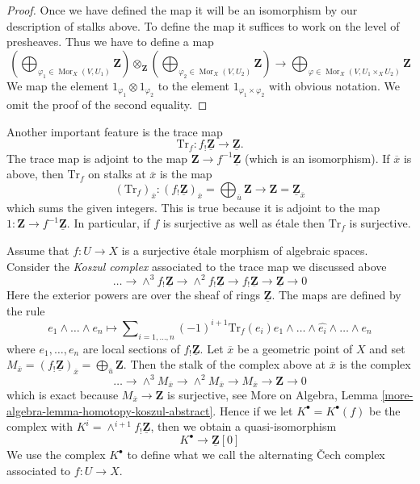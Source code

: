 \documentclass{stacks-project}
\theoremstyle{plain}
\theoremstyle{definition}
\theoremstyle{remark}
\numberwithin{equation}{subsection}
\def\Mor{\mathop{\mathrm{Mor}}\nolimits}
\begin{document}
\begin{proof}
Once we have defined the map it will be an isomorphism by our description
of stalks above. To define the map it suffices to work on the level of
presheaves. Thus we have to define a map
$$
\left(\bigoplus\nolimits_{\varphi_1 \in \Mor_X(V, U_1)} \mathbf{Z}\right)
\otimes_{\mathbf{Z}}
\left(\bigoplus\nolimits_{\varphi_2 \in \Mor_X(V, U_2)} \mathbf{Z}\right)
\longrightarrow
\bigoplus\nolimits_{\varphi \in \Mor_X(V, U_1 \times_X U_2)}
\mathbf{Z}
$$
We map the element $1_{\varphi_1} \otimes 1_{\varphi_2}$ to the element
$1_{\varphi_1 \times \varphi_2}$ with obvious notation. We omit the proof
of the second equality.
\end{proof}

\noindent
Another important feature is the trace map
$$
\text{Tr}_f : f_!\underline{\mathbf{Z}} \longrightarrow \underline{\mathbf{Z}}.
$$
The trace map is adjoint to the
map $\mathbf{Z} \to f^{-1}\underline{\mathbf{Z}}$ (which is an isomorphism).
If $\overline{x}$ is above, then $\text{Tr}_f$ on stalks at $\overline{x}$
is the map
$$
(\text{Tr}_f)_{\overline{x}} :
(f_!\underline{\mathbf{Z}})_{\overline{x}} =
\bigoplus\nolimits_{\overline{u}} \mathbf{Z}
\longrightarrow
\mathbf{Z} = \underline{\mathbf{Z}}_{\overline{x}}
$$
which sums the given integers. This is true because it is adjoint to the map
$1 : \mathbf{Z} \to f^{-1}\underline{\mathbf{Z}}$. In particular, if
$f$ is surjective as well as \'etale then $\text{Tr}_f$ is surjective.

\medskip\noindent
Assume that $f : U \to X$ is a surjective \'etale
morphism of algebraic spaces. Consider the {\it Koszul complex}
associated to the trace map we discussed above
$$
\ldots \to \wedge^3f_!\underline{\mathbf{Z}} \to
\wedge^2f_!\underline{\mathbf{Z}} \to f_!\underline{\mathbf{Z}} \to
\underline{\mathbf{Z}} \to 0
$$
Here the exterior powers are over the sheaf of rings $\underline{\mathbf{Z}}$.
The maps are defined by the rule
$$
e_1 \wedge \ldots \wedge e_n \longmapsto
\sum\nolimits_{i = 1, \ldots, n} (-1)^{i + 1}
\text{Tr}_f(e_i)
e_1 \wedge \ldots \wedge \widehat{e_i} \wedge \ldots \wedge e_n
$$
where $e_1, \ldots, e_n$ are local sections of $f_!\underline{\mathbf{Z}}$.
Let $\overline{x}$ be a geometric point of $X$ and set
$M_{\overline{x}} = (f_!\underline{\mathbf{Z}})_{\overline{x}} =
\bigoplus_{\overline{u}} \mathbf{Z}$. Then the stalk of the complex above at
$\overline{x}$ is the complex
$$
\ldots \to \wedge^3 M_{\overline{x}} \to \wedge^2 M_{\overline{x}}
\to M_{\overline{x}} \to \mathbf{Z} \to 0
$$
which is exact because $M_{\overline{x}} \to \mathbf{Z}$ is surjective, see
More on Algebra, Lemma \ref{more-algebra-lemma-homotopy-koszul-abstract}.
Hence if we let $K^\bullet = K^\bullet(f)$ be the complex with
$K^i = \wedge^{i + 1}f_!\underline{\mathbf{Z}}$, then we obtain a
quasi-isomorphism
\begin{equation}
\label{equation-quasi-isomorphism}
K^\bullet \longrightarrow \underline{\mathbf{Z}}[0]
\end{equation}
We use the complex $K^\bullet$ to define what we call
the alternating {\v C}ech complex associated to $f : U \to X$.
\end{document}
